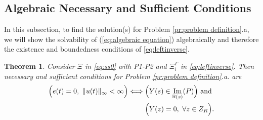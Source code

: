 \documentclass[journal]{IEEEtran}
\newtheorem{theorem}{Theorem}
\theoremstyle{remark}
\DeclareMathOperator*{\im}{Im}
\begin{document}
\subsection{Algebraic Necessary and Sufficient Conditions} \label{sec:algebraic_iff}
In this subsection, to find the solution(s) for Problem \ref{pr:problem definition}.a, we will show the solvability of (\ref{eq:algebraic equation}) algebraically and therefore the existence and boundedness conditions of \eqref{eq:leftinverse}. 

\begin{theorem} \label{th:algebraic_iff}
Consider $\Xi$ in \eqref{eq:ss0} with P1-P2 and $\Xi^\Gamma_i$ in \eqref{eq:leftinverse}. Then necessary and sufficient conditions for Problem \ref{pr:problem definition}.a. are
\begin{align*}
    \Bigl( e(t)=0, \ \Vert u(t) \Vert_\infty < \infty \Bigl) \iff & \Bigl( Y(s) \in \im_{\mathbb{R}(s)}(P) \Bigl) \text{ and } \\
     & \Bigl( Y(z) = 0, \ \forall z \in Z_R \Bigl).
\end{align*}
\end{theorem}
\end{document}
